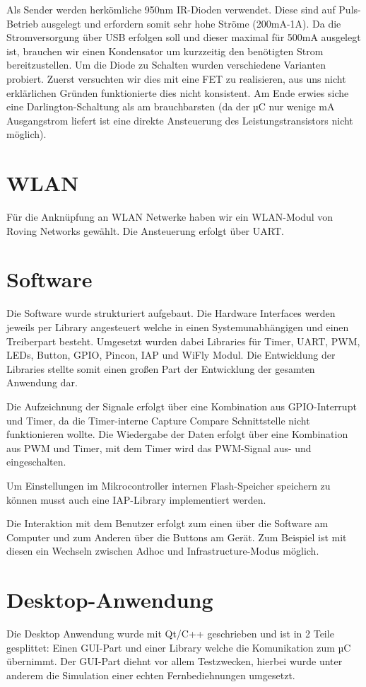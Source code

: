 \documentclass[11pt,a4paper,bibtotoc,oneside]{scrbook}
\begin{document}
Als Sender werden herkömliche 950nm IR-Dioden verwendet. Diese sind auf Puls-Betrieb ausgelegt und erfordern somit 
sehr hohe Ströme (200mA-1A). Da die Stromversorgung über USB erfolgen soll und dieser maximal für 500mA ausgelegt 
ist, brauchen wir einen Kondensator um kurzzeitig den benötigten Strom bereitzustellen. Um die Diode zu Schalten
wurden verschiedene Varianten probiert. Zuerst versuchten wir dies mit eine FET zu realisieren, aus uns
nicht erklärlichen Gründen funktionierte dies nicht konsistent. Am Ende erwies siche eine Darlington-Schaltung als
am brauchbarsten (da der µC nur wenige mA Ausgangstrom liefert ist eine direkte Ansteuerung des Leistungstransistors
nicht möglich).

\section{WLAN}
Für die Anknüpfung an WLAN Netwerke haben wir ein WLAN-Modul von Roving Networks gewählt. Die Ansteuerung erfolgt über
UART.

\section{Software}
Die Software wurde strukturiert aufgebaut. Die Hardware Interfaces werden jeweils per Library angesteuert
welche in einen Systemunabhängigen und einen Treiberpart besteht. Umgesetzt wurden dabei Libraries für
Timer, UART, PWM, LEDs, Button, GPIO, Pincon, IAP und WiFly Modul. Die Entwicklung der Libraries stellte somit
einen großen Part der Entwicklung der gesamten Anwendung dar.

Die Aufzeichnung der Signale erfolgt über eine Kombination aus GPIO-Interrupt und Timer, da die Timer-interne
Capture Compare Schnittstelle nicht funktionieren wollte. Die Wiedergabe der Daten erfolgt über eine Kombination aus PWM und
Timer, mit dem Timer wird das PWM-Signal aus- und eingeschalten.

Um Einstellungen im Mikrocontroller internen Flash-Speicher speichern zu können musst auch eine IAP-Library 
implementiert werden.

Die Interaktion mit dem Benutzer erfolgt zum einen über die Software am Computer und zum Anderen über die Buttons
am Gerät. Zum Beispiel ist mit diesen ein Wechseln zwischen Adhoc und Infrastructure-Modus möglich.

\section{Desktop-Anwendung}
Die Desktop Anwendung wurde mit Qt/C++ geschrieben und ist in 2 Teile gesplittet: Einen GUI-Part und einer Library welche die
Komunikation zum µC übernimmt. Der GUI-Part diehnt vor allem Testzwecken, hierbei wurde unter anderem die Simulation
einer echten Fernbediehnungen umgesetzt. 
\end{document}
